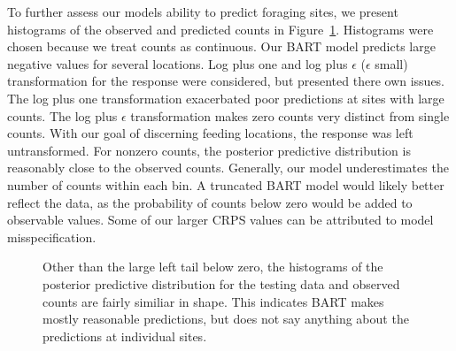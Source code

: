 \documentclass[
  12pt,
  letterpaper,
  DIV=11,
  numbers=noendperiod]{scrartcl}
\begin{document}
To further assess our models ability to predict foraging sites, we
present histograms of the observed and predicted counts in
Figure~\ref{fig-hist}. Histograms were chosen because we treat counts as
continuous. Our BART model predicts large negative values for several
locations. Log plus one and log plus \(\epsilon\) (\(\epsilon\) small)
transformation for the response were considered, but presented there own
issues. The log plus one transformation exacerbated poor predictions at
sites with large counts. The log plus \(\epsilon\) transformation makes
zero counts very distinct from single counts. With our goal of
discerning feeding locations, the response was left untransformed. For
nonzero counts, the posterior predictive distribution is reasonably
close to the observed counts. Generally, our model underestimates the
number of counts within each bin. A truncated BART model would likely
better reflect the data, as the probability of counts below zero would
be added to observable values. Some of our larger CRPS values can be
attributed to model misspecification.

\begin{figure}[H]


\caption{\label{fig-hist}Other than the large left tail below zero, the
histograms of the posterior predictive distribution for the testing data
and observed counts are fairly similiar in shape. This indicates BART
makes mostly reasonable predictions, but does not say anything about the
predictions at individual sites.}

\end{figure}%
\end{document}
